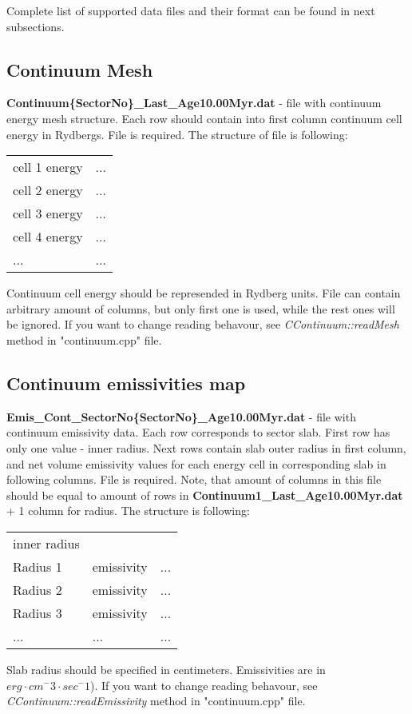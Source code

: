 \documentclass[a4paper]{article}
\begin{document}
Complete list of supported data files and their format can be found in next subsections.

\subsection{Continuum Mesh}
{\bf Continuum\{SectorNo\}\_Last\_Age10.00Myr.dat} - file with continuum energy mesh structure.
Each row should contain into first column continuum cell energy in Rydbergs. 
File is required. The structure of file is following:
\begin{table}[H]
\begin{tabular}{ll}
cell 1 energy & ... \\
cell 2 energy & ... \\
cell 3 energy & ... \\
cell 4 energy & ... \\
... & ... \\
\end{tabular}
\end{table}
Continuum cell energy should be represended in Rydberg units. File can contain arbitrary amount of columns, but only first one is used,
while the rest ones will be ignored.
If you want to change reading behavour, see {\it CContinuum::readMesh} method in "continuum.cpp" file.

\subsection{Continuum emissivities map}
{\bf Emis\_Cont\_SectorNo\{SectorNo\}\_Age10.00Myr.dat} - file with continuum emissivity data. Each row
corresponds to sector slab. First row has only one value - inner radius. Next rows contain slab outer radius in first column, 
and net volume emissivity values for each energy cell in corresponding slab in following columns. File is required. Note, that amount of columns in this file should
be equal to amount of rows in {\bf Continuum1\_Last\_Age10.00Myr.dat} + 1 column for radius.
The structure is following:
\begin{table}[H]
    \begin{tabular}{lll}
        inner radius & & \\
        Radius 1 & emissivity & ... \\
        Radius 2 & emissivity & ... \\
        Radius 3 & emissivity & ... \\
        ... & ... & ... \\
    \end{tabular}
\end{table}
Slab radius should be specified in centimeters. Emissivities are in $erg \cdot cm^-3 \cdot sec^-1$).
If you want to change reading behavour, see {\it CContinuum::readEmissivity} method in "continuum.cpp" file.
\end{document}
